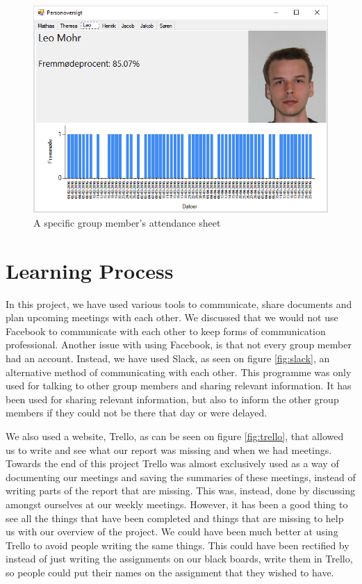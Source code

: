 \documentclass{article}
\begin{document}
\begin{figure}
	\centering
	\includegraphics[width=1\textwidth]{figures/soerenfravaer.png}
	\caption{A specific group member's attendance sheet}
	\label{fig:soerenfravaer}
\end{figure}

\section{Learning Process}
In this project, we have used various tools to communicate, share documents and plan upcoming meetings with each other. 
We discussed that we would not use Facebook to communicate with each other to keep forms of communication professional. Another issue with using Facebook, is that not every group member had an account.
Instead, we have used Slack, as seen on figure \ref{fig:slack}, an alternative method of communicating with each other. 
This programme was only used for talking to other group members and sharing relevant information. 
It has been used for sharing relevant information, but also to inform the other group members if they could not be there that day or were delayed. 

We also used a website, Trello, as can be seen on figure \ref{fig:trello}, that allowed us to write and see what our report was missing and when we had meetings. 
Towards the end of this project Trello was almost exclusively used as a way of documenting our meetings and saving the summaries of these meetings, instead of writing parts of the report that are missing. 
This was, instead, done by discussing amongst ourselves at our weekly meetings.
However, it has been a good thing to see all the things that have been completed and things that are missing to help us with our overview of the project.
We could have been much better at using Trello to avoid people writing the same things. This could have been rectified by instead of just writing the assignments on our black boards, write them in Trello, so people could put their names on the assignment that they wished to have.
\end{document}
